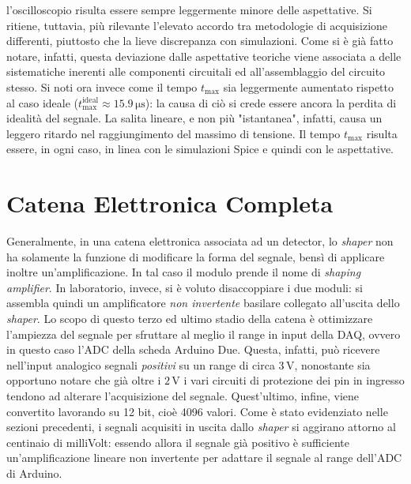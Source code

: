 \documentclass[a4paper,11pt]{article} %
\begin{document}
l'oscilloscopio risulta essere sempre leggermente minore delle aspettative. Si ritiene, tuttavia, più rilevante
l'elevato accordo tra metodologie di acquisizione differenti, piuttosto che la lieve discrepanza con simulazioni. Come
si è già fatto notare, infatti, questa deviazione dalle aspettative teoriche viene associata a delle sistematiche
inerenti alle componenti circuitali ed all'assemblaggio del circuito stesso. Si noti ora invece come il tempo
$t_{\text{max}}$ sia leggermente aumentato rispetto al caso ideale ($t_{\text{max}}^{\text{ideal}}\approx
15.9\,\si{\us}$): la causa di ciò si crede essere ancora la perdita di idealità del segnale. La salita lineare, e non
più "istantanea", infatti, causa un leggero ritardo nel raggiungimento del massimo di tensione. Il tempo
$t_{\text{max}}$ risulta essere, in ogni caso, in linea con le simulazioni Spice e quindi con le aspettative. 


\section{Catena Elettronica Completa}\label{s:catena}

Generalmente, in una catena elettronica associata ad un detector, lo \textit{shaper} non ha solamente la funzione di
modificare la forma del segnale, bensì di applicare inoltre un'amplificazione. In tal caso il modulo prende il nome di
\textit{shaping amplifier}. In laboratorio, invece, si è voluto disaccoppiare i due moduli: si assembla quindi un
amplificatore \textit{non invertente} basilare collegato all'uscita dello \textit{shaper}. Lo scopo di questo terzo ed
ultimo stadio della catena è ottimizzare l'ampiezza del segnale per sfruttare al meglio il range in input della DAQ,
ovvero in questo caso l'ADC della scheda Arduino Due. Questa, infatti, può ricevere nell'input analogico segnali
\textit{positivi} su un range di circa $3\,\si{\volt}$, nonostante sia opportuno notare che già oltre i $2\,\si{\volt}$
i vari circuiti di protezione dei pin in ingresso tendono ad alterare l'acquisizione del segnale. Quest'ultimo, infine,
viene convertito lavorando su 12 bit, cioè 4096 valori. Come è stato evidenziato nelle sezioni precedenti, i segnali
acquisiti in uscita dallo \textit{shaper} si aggirano attorno al centinaio di milliVolt: essendo allora il segnale già
positivo è sufficiente un'amplificazione lineare non invertente per adattare il segnale al range dell'ADC di Arduino. 
\end{document}
